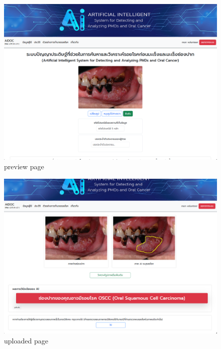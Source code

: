   \begin{figure}[H]
    \centering
    \graphicspath{{./images/}}
    \includegraphics[scale=0.3]{preview_volunteer.png}
    \caption{preview page}
    \label{fig:preview_volunteer}
  \end{figure}

    \begin{figure}[H]
      \centering
      \graphicspath{{./images/}}
      \includegraphics[scale=0.3]{upload_complete_volunteer.png}
      \caption{uploaded page}
      \label{fig:upload_complete_volunteer}
    \end{figure}